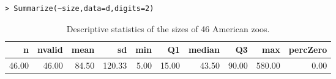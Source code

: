 \documentclass[10pt,openany]{book}\usepackage[]{graphicx}\usepackage[]{color}
\makeatletter
\newenvironment{kframe}{%
 \def\at@end@of@kframe{}%
 \ifinner\ifhmode%
  \def\at@end@of@kframe{\end{minipage}}%
  \begin{minipage}{\columnwidth}%
 \fi\fi%
 \def\FrameCommand##1{\hskip\@totalleftmargin \hskip-\fboxsep
 \colorbox{shadecolor}{##1}\hskip-\fboxsep
     \hskip-\linewidth \hskip-\@totalleftmargin \hskip\columnwidth}%
 \MakeFramed {\advance\hsize-\width
   \@totalleftmargin\z@ \linewidth\hsize
   \@setminipage}}%
 {\par\unskip\endMakeFramed%
 \at@end@of@kframe}
\newenvironment{knitrout}{}{} %
\makeatother
\begin{document}
\begin{itemize}
\begin{knitrout}
\end{knitrout}
\begin{knitrout}
\color{fgcolor}\begin{kframe}
\begin{verbatim}
> Summarize(~size,data=d,digits=2)
\end{verbatim}
\end{kframe}
\end{knitrout}
\begin{table}[ht]
\centering
\caption{Descriptive statistics of the sizes of 46 American zoos.} 
\label{tab:ZooSum}
\begin{tabular}{rrrrrrrrrr}
  \hline
n & nvalid & mean & sd & min & Q1 & median & Q3 & max & percZero \\ 
  \hline
46.00 & 46.00 & 84.50 & 120.33 & 5.00 & 15.00 & 43.50 & 90.00 & 580.00 & 0.00 \\ 
   \hline
\end{tabular}
\end{table}


\end{itemize}




\end{document}
